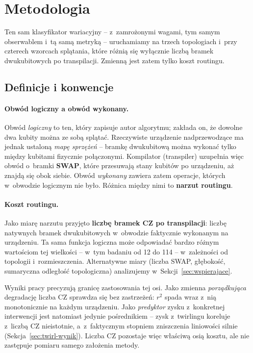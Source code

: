 \documentclass[11pt]{article}
\begin{document}
\section{Metodologia}\label{sec:metody}

Ten sam klasyfikator wariacyjny -- z~zamrożonymi wagami, tym samym obserwablem i~tą samą metryką --
uruchamiamy na trzech topologiach i~przy czterech wzorcach splątania, które różnią się wyłącznie
liczbą bramek dwukubitowych po transpilacji. Zmienną jest zatem tylko koszt routingu.

\subsection{Definicje i konwencje}\label{sec:definicje}

\paragraph{Obwód logiczny a obwód wykonany.} Obwód \emph{logiczny} to ten, który zapisuje autor
algorytmu; zakłada on, że dowolne dwa kubity można ze sobą splątać. Rzeczywiste urządzenie
nadprzewodzące ma jednak ustaloną \emph{mapę sprzężeń} -- bramkę dwukubitową można wykonać tylko
między kubitami fizycznie połączonymi. Kompilator (transpiler) uzupełnia więc obwód o~bramki
\textbf{SWAP}, które przesuwają stany kubitów po urządzeniu, aż znajdą się obok siebie. Obwód
\emph{wykonany} zawiera zatem operacje, których w~obwodzie logicznym nie było. Różnica między nimi to
\textbf{narzut routingu}.

\paragraph{Koszt routingu.} Jako miarę narzutu przyjęto \textbf{liczbę bramek CZ po
transpilacji}: liczbę natywnych bramek dwukubitowych w~obwodzie faktycznie wykonanym na urządzeniu.
Ta sama funkcja logiczna może odpowiadać bardzo różnym wartościom tej wielkości -- w~tym badaniu
od 12 do 114 -- w~zależności od topologii i~rozmieszczenia. Alternatywne miary (liczba SWAP,
głębokość, sumaryczna odległość topologiczna) analizujemy w~Sekcji~\ref{sec:wspierajace}.

Wyniki pracy precyzują granicę zastosowania tej osi. Jako zmienna
\emph{porządkująca} degradację liczba CZ sprawdza się bez zastrzeżeń: $r^2$ spada wraz z~nią
monotonicznie na każdym urządzeniu. Jako \emph{predyktor} zysku z~konkretnej interwencji jest
natomiast jedynie pośrednikiem -- zysk z~twirlingu koreluje z~liczbą CZ nieistotnie, a~z~faktycznym
stopniem zniszczenia liniowości silnie (Sekcja~\ref{sec:twirl-wynik}). Liczba CZ pozostaje więc
właściwą osią kosztu, ale nie zastępuje pomiaru samego założenia metody.
\end{document}

